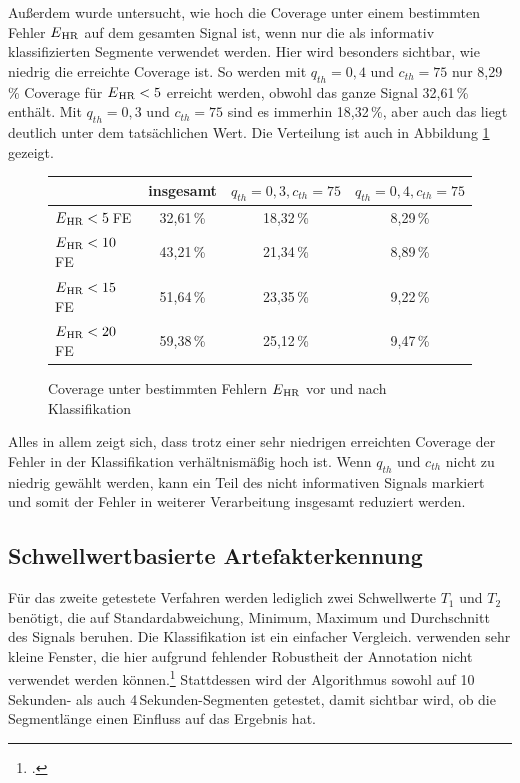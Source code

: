  Außerdem wurde untersucht, wie hoch die Coverage unter einem bestimmten Fehler $E\textsubscript{HR}$ auf dem gesamten Signal ist, wenn nur die als informativ klassifizierten Segmente verwendet werden. Hier wird besonders sichtbar, wie niedrig die erreichte Coverage ist. So werden mit $q_{th}=0{,}4$ und $c_{th}=75$ nur 8{,}29\,\% Coverage für $E\textsubscript{HR} < 5$ erreicht werden, obwohl das ganze Signal 32{,}61\,\% enthält. Mit $q_{th}=0{,}3$ und $c_{th}=75$ sind es immerhin 18{,}32\,\%, aber auch das liegt deutlich unter dem tatsächlichen Wert. Die Verteilung ist auch in Abbildung \ref{fig:brueser-coverage} gezeigt.
 
 \begin{figure}[H]
 	\centering
  	\begin{tabular}{l || c | c | c}
 											& insgesamt 		& $q_{th}=0{,}3, c_{th}=75$ & $q_{th}=0{,}4, c_{th}=75$\\\hline
 		$E\textsubscript{HR} < 5$\,\si{FE} 	&  32{,}61\,\% 	& 18,32\,\% 					& 8,29\,\%	\\
 		$E\textsubscript{HR} < 10$\,\si{FE} 	&  43{,}21\,\% 	& 21,34\,\% 					& 8,89\,\%	\\
 		$E\textsubscript{HR} < 15$\,\si{FE} 	&  51{,}64\,\% 	& 23,35\,\% 					& 9,22\,\%	\\
 		$E\textsubscript{HR} < 20$\,\si{FE} 	&  59{,}38\,\% 	& 25,12\,\% 					& 9,47\,\%\\
 	\end{tabular}
 	\caption[Coverage unter bestimmten Fehlern $E\textsubscript{HR}$ vor und nach Klassifikation]{Coverage unter bestimmten Fehlern $E\textsubscript{HR}$ vor und nach Klassifikation}
 	\label{fig:brueser-coverage}
 \end{figure}
 
 Alles in allem zeigt sich, dass trotz einer sehr niedrigen erreichten Coverage der Fehler in der Klassifikation verhältnismäßig hoch ist. Wenn $q_{th}$ und $c_{th}$ nicht zu niedrig gewählt werden, kann ein Teil des nicht informativen Signals markiert und somit der Fehler in weiterer Verarbeitung insgesamt reduziert werden. 
 

\subsection{Schwellwertbasierte Artefakterkennung}

Für das zweite getestete Verfahren werden lediglich zwei Schwellwerte $T_1$ und $T_2$ benötigt, die auf Standardabweichung, Minimum, Maximum und Durchschnitt des Signals beruhen. Die Klassifikation ist ein einfacher Vergleich. \citeauthor{Pino2015} verwenden sehr kleine Fenster, die hier aufgrund fehlender Robustheit der Annotation nicht verwendet werden können.\footcite[]{Pino2015} Stattdessen wird der Algorithmus sowohl auf 10\,Sekunden- als auch 4\,Sekunden-Segmenten getestet, damit sichtbar wird, ob die Segmentlänge einen Einfluss auf das Ergebnis hat.

